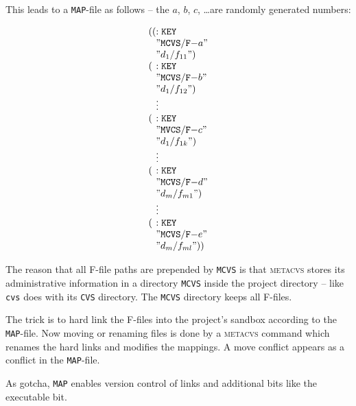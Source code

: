 \documentclass[fleqn, 10pt, a4paper]{report} \usepackage{amssymb}
\begin{document}
\newpage

This leads to a \texttt{MAP}-file as follows -- the $a$, $b$, $c$,
\ldots are randomly generated numbers:

\begin{displaymath}
  \begin{array}{l@{}l}
    \mathtt{((} & \mathtt{:KEY} \\
    & \mathtt{"MCVS/F-}a \mathtt{"} \\
    & \mathtt{"}d_1/f_{11}\mathtt{")} \\
    \mathtt{(}  & \mathtt{:KEY} \\
    & \mathtt{"MCVS/F-}b \mathtt{"} \\
    & \mathtt{"}d_1/f_{12}\mathtt{")} \\
    & \vdots \\
    \mathtt{(}  & \mathtt{:KEY} \\
    & \mathtt{"MVCS/F-}c \mathtt{"} \\
    & \mathtt{"}d_1/f_{1k}\mathtt{")} \\
    & \vdots \\
    \mathtt{(}  & \mathtt{:KEY} \\
    & \mathtt{"MCVS/F-}d \mathtt{"} \\
    & \mathtt{"}d_m/f_{m1}\mathtt{")} \\
    & \vdots \\
    \mathtt{(}  & \mathtt{:KEY} \\
    & \mathtt{"MCVS/F-}e \mathtt{"} \\
    & \mathtt{"}d_m/f_{ml}\mathtt{"))} \\
  \end{array}
\end{displaymath}

The reason that all F-file paths are prepended by \texttt{MCVS} is
that \textsc{metacvs} stores its administrative information in a
directory \texttt{MCVS} inside the project directory -- like
\texttt{cvs} does with its \texttt{CVS} directory. The \texttt{MCVS}
directory keeps all F-files.

The trick is to hard link the F-files into the project's sandbox
according to the \texttt{MAP}-file. Now moving or renaming files is
done by a \textsc{metacvs} command which renames the hard links and
modifies the mappings. A move conflict appears as a conflict in the
\texttt{MAP}-file.

As gotcha, \texttt{MAP} enables version control of links and
additional bits like the executable bit.
\end{document}
